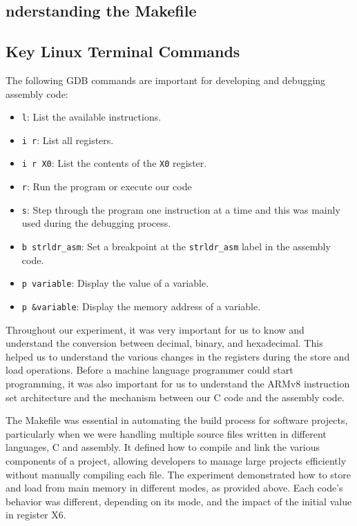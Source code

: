 \subsection*{nderstanding the Makefile}

\subsection*{Key Linux Terminal Commands}
The following GDB commands are important for developing and debugging assembly code:
\begin{itemize}
    \item \texttt{l}: List the available instructions.
    \item \texttt{i r}: List all registers.
    \item \texttt{i r X0}: List the contents of the \texttt{X0} register.
    \item \texttt{r}: Run the program or execute our code
    \item \texttt{s}: Step through the program one instruction at a time and this was mainly used during the debugging process.
    \item \texttt{b strldr\_asm}: Set a breakpoint at the \texttt{strldr\_asm} label in the assembly code.
    \item \texttt{p variable}: Display the value of a variable.
    \item \texttt{p \&variable}: Display the memory address of a variable.
\end{itemize}

Throughout our experiment, it was very important for us to know and understand the conversion between decimal, binary, and hexadecimal. This helped us to understand the various changes in the registers during the store and load operations. Before a machine language programmer could start programming, it was also important for us to understand the ARMv8 instruction set architecture and the mechanism between our C code and the assembly code.

The Makefile was essential in automating the build process for software projects, particularly when we were handling multiple source files written in different languages, C and assembly. It defined how to compile and link the various components of a project, allowing developers to manage large projects efficiently without manually compiling each file. The experiment demonstrated how to store and load from main memory in different modes, as provided above. Each code's behavior was different, depending on its mode, and the impact of the initial value in register X6.

